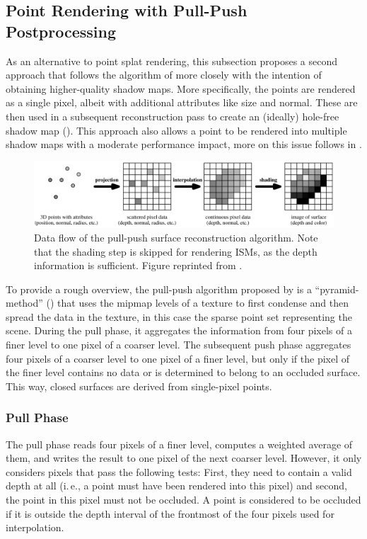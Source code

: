 \subsection{Point Rendering with Pull-Push Postprocessing}

As an alternative to point splat rendering, this subsection proposes a second approach that follows the algorithm of \citet{Marroquim:2007:reconstruction} more closely with the intention of obtaining higher-quality shadow maps. More specifically, the points are rendered as a single pixel, albeit with additional attributes like size and normal. These are then used in a subsequent reconstruction pass to create an (ideally) hole-free shadow map (). This approach also allows a point to be rendered into multiple shadow maps with a moderate performance impact, more on this issue follows in .


\begin{figure}[htb]
\centering
    \includegraphics[width=\textwidth]{graphics/pullpush_dataflow_marroquim}
  \caption{Data flow of the pull-push surface reconstruction algorithm. Note that the shading step is skipped for rendering ISMs, as the depth information is sufficient. Figure reprinted from \citet{Marroquim:2007:reconstruction}.}
  \label{fig:concept:pull_push_dataflow_marroquim}
\end{figure}


To provide a rough overview, the pull-push algorithm proposed by \citet{Marroquim:2007:reconstruction} is a ``pyramid-method'' (\cite{Strengert:2006:Pyramid}) that uses the mipmap levels of a texture to first condense and then spread the data in the texture, in this case the sparse point set representing the scene. During the pull phase, it aggregates the information from four pixels of a finer level to one pixel of a coarser level. The subsequent push phase aggregates four pixels of a coarser level to one pixel of a finer level, but only if the pixel of the finer level contains no data or is determined to belong to an occluded surface. This way, closed surfaces are derived from single-pixel points.


\subsubsection{Pull Phase}
The pull phase reads four pixels of a finer level, computes a weighted average of them, and writes the result to one pixel of the next coarser level. However, it only considers pixels that pass the following tests: First, they need to contain a valid depth at all (i.\,e., a point must have been rendered into this pixel) and second, the point in this pixel must not be occluded. A point is considered to be occluded if it is outside the depth interval of the frontmost of the four pixels used for interpolation.

